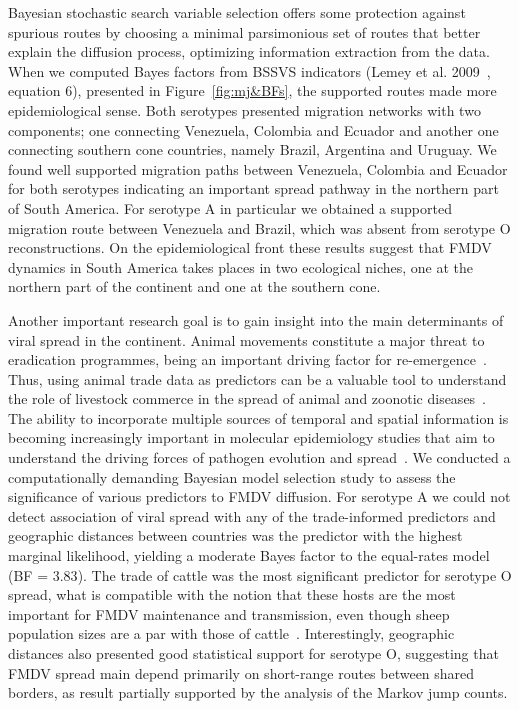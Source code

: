 \documentclass[10pt]{article}
\begin{document}
Bayesian stochastic search variable selection offers some protection against spurious routes by choosing a minimal parsimonious set of routes that better explain the diffusion process, optimizing information extraction from the data. 
When we computed Bayes factors from BSSVS indicators (Lemey et al. 2009~\cite{roots}, equation 6), presented in Figure~\ref{fig:mj&BFs}, the supported routes made more epidemiological sense.
Both serotypes presented migration networks with two components; one connecting Venezuela, Colombia and Ecuador and another one connecting southern cone countries, namely Brazil, Argentina and Uruguay.
We found well supported migration paths between Venezuela, Colombia and Ecuador for both serotypes  indicating an important spread pathway in the northern part of South America.
For serotype A in particular we obtained a supported migration route between Venezuela and Brazil, which was absent from serotype O reconstructions.
On the epidemiological front these results suggest that FMDV dynamics in South America takes places in two ecological niches, one at the northern part of the continent and one at the southern cone. 


Another important research goal is to gain insight into the main determinants of viral spread in the continent.
Animal movements constitute a major threat to eradication programmes, being an important driving factor for re-emergence~\cite{movements}.
Thus, using animal trade data as predictors can be a valuable tool to understand the role of livestock commerce in the spread of animal and zoonotic diseases~\cite{Nelson2011}.
The ability to incorporate multiple sources of temporal and spatial information is becoming increasingly important in molecular epidemiology studies that aim to understand the driving forces of pathogen evolution and spread~\cite{towards, combining, MEP, roots}.
We conducted a computationally demanding Bayesian model selection study to assess the significance of various predictors to FMDV diffusion.
For serotype A we could not detect association of viral spread with any of the trade-informed predictors and geographic distances between countries was the predictor with the highest marginal likelihood, yielding a moderate Bayes factor to the equal-rates model (BF = $3.83$).
The trade of cattle was the most significant predictor for serotype O spread, what is compatible with the notion that these hosts are the most important for FMDV maintenance and transmission, even though sheep population sizes are a par with those of cattle~\cite{Saraiva2003}.
Interestingly, geographic distances also presented good statistical support for serotype O, suggesting that FMDV spread main depend primarily on short-range routes between shared borders, as result partially supported by the analysis of the Markov jump counts.
\end{document}
